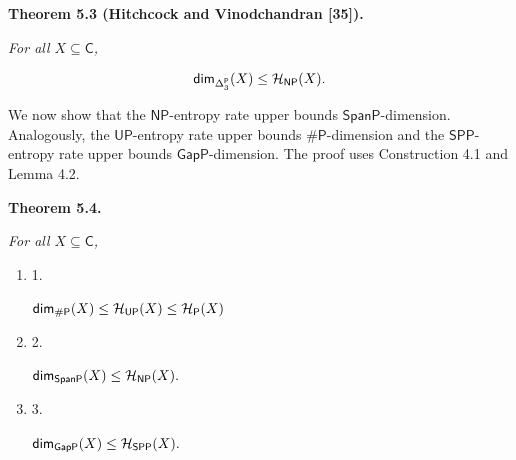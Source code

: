 \documentclass[10pt,a4paper]{article}
\begin{document}
\par\medskip\noindent\textbf{
\textbf{Theorem 5.3}\textbf{ }(Hitchcock and Vinodchandran [35])\textbf{.}
}\par



\emph{For all $X\subseteq\mathsf{C}$,}\par


\[\begin{gathered}
{\mathsf{dim}}_{\Delta^{\mathsf{P}}_{3}}(X)\leq{\cal H}_{\mathsf{NP}}(X).
\end{gathered}\]






We now show that the $\mathsf{NP}$-entropy rate upper bounds $\mathsf{SpanP}$-dimension. Analogously, the $\mathsf{UP}$-entropy rate upper bounds ${\mathsf{\#}\mathsf{P}}$-dimension and the $\mathsf{SPP}$-entropy rate upper bounds $\mathsf{GapP}$-dimension. The proof uses Construction 4.1 and Lemma 4.2.\par





\par\medskip\noindent\textbf{
\textbf{Theorem 5.4}\textbf{.}
}\par



\emph{For all $X\subseteq\mathsf{C}$,}\par


\begin{enumerate}


\item[] 
1. 


${\mathsf{dim}}_{\mathsf{\#}\mathsf{P}}(X)\leq{\cal H}_{\mathsf{UP}}(X)\leq{\cal H}_{\mathsf{P}}(X)$\emph{}\par





\item[] 
2. 


${\mathsf{dim}}_{\mathsf{SpanP}}(X)\leq{\cal H}_{\mathsf{NP}}(X).$\emph{}\par





\item[] 
3. 


${\mathsf{dim}}_{\mathsf{GapP}}(X)\leq{\cal H}_{\mathsf{SPP}}(X).$\emph{}\par





\end{enumerate}
\end{document}
